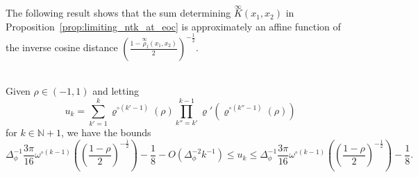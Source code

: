 \documentclass[twoside,11pt]{article}
\newcommand{\N}{\mathbb{N}}
\newcommand{\limiting}[1]{\overset{\scriptscriptstyle\infty}{#1}}
\begin{document}
The following result shows that the sum determining $\limiting{K}(x_1,x_2)$ in Proposition~\ref{prop:limiting_ntk_at_eoc} is approximately an affine function of the inverse cosine distance $\left( \frac{1 - \limiting{\rho}_l(x_1,x_2)}{2} \right)^{-\frac{1}{2}}$.

\begin{proposition}\label{prop:inverse_cosine_distances_approximate_ntk}~\\
Given $\rho \in (-1,1)$ and letting
\[
u_k = \sum_{k'=1}^k \varrho^{\circ (k'-1)}(\rho) \prod_{k''=k'}^{k-1} \varrho'(\varrho^{\circ (k''-1)}(\rho))
\]
for $k \in \N+1$, we have the bounds
\[
\Delta_\phi^{-1} \frac{3\pi}{16} \omega^{\circ (k-1)}\left( \left( \frac{1-\rho}{2} \right)^{-\frac{1}{2}} \right) - \frac{1}{8} - O(\Delta_\phi^{-2} k^{-1})
\leq u_k
\leq \Delta_\phi^{-1} \frac{3\pi}{16} \omega^{\circ (k-1)}\left( \left( \frac{1-\rho}{2} \right)^{-\frac{1}{2}} \right) - \frac{1}{8}.
\]
\end{proposition}
\end{document}
